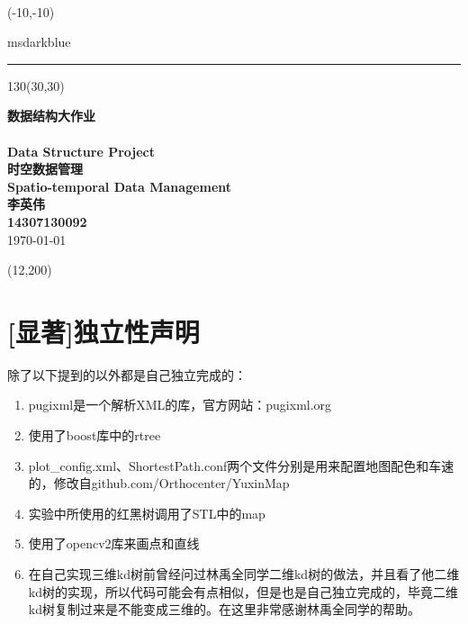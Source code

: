 \documentclass[10pt]{scrartcl}
\begin{document}
 
\setlength{\TPHorizModule}{1.2mm}
\setlength{\TPVertModule}{1mm}
 
\begin{titlepage}
~
\begin{textblock}{50}(-10,-10)
  \begin{color}{msdarkblue}
    \rule{3cm}{25cm}    
  \end{color}
\end{textblock}
 
\begin{textblock}{130}(30,30)
 
{\noindent\Huge\bfseries 数据结构大作业 \\ \\ Data Structure Project } \\[0.1em]
 
{\noindent\huge\bfseries  时空数据管理\\[0.05em] Spatio-temporal Data Management }\\[5em]
 
{\noindent\Large\bfseries 李英伟 \\ 14307130092}\\[1em]

{\noindent\Large \today }
 
\end{textblock}
 
 
\begin{textblock}{20}(12,200)
\begin{rotate}{90}
{\huge\bfseries \textcolor{white}{}}
\end{rotate}
\end{textblock}
 
\end{titlepage}
 
 
\tableofcontents
 
\clearpage

\section{[显著]独立性声明}
除了以下提到的以外都是自己独立完成的：
\begin{enumerate}
    \item pugixml是一个解析XML的库，官方网站：pugixml.org
    \item 使用了boost库中的rtree
    \item plot\_config.xml、ShortestPath.conf两个文件分别是用来配置地图配色和车速的，修改自github.com/Orthocenter/YuxinMap
    \item 实验中所使用的红黑树调用了STL中的map
    \item 使用了opencv2库来画点和直线
    \item 在自己实现三维kd树前曾经问过林禹全同学二维kd树的做法，并且看了他二维kd树的实现，所以代码可能会有点相似，但是也是自己独立完成的，毕竟二维kd树复制过来是不能变成三维的。在这里非常感谢林禹全同学的帮助。
\end{enumerate}
\end{document}

